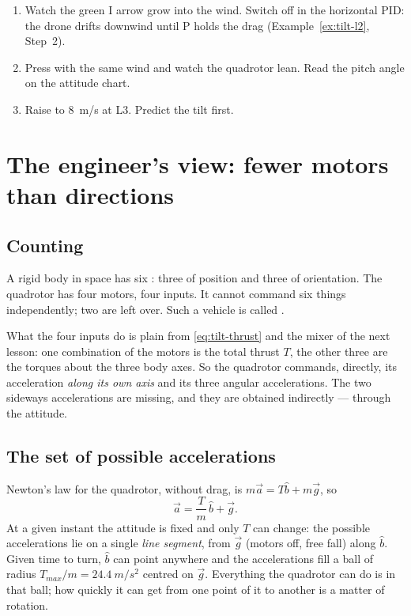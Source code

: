 \begin{trythis}
\begin{enumerate}
  \item Watch the green I arrow grow into the wind. Switch \It off in the horizontal PID: the drone drifts downwind until P holds the drag (Example~\ref{ex:tilt-l2}, Step~2).
  \item Press  with the same wind and watch the quadrotor lean. Read the pitch angle on the attitude chart.
  \item Raise  to \SI{8}{m/s} at L3. Predict the tilt first.
\end{enumerate}
\end{trythis}

\section{The engineer's view: fewer motors than directions}

\subsection{Counting}
A rigid body in space has six : three of position and three of orientation. The quadrotor has four motors, four inputs. It cannot command six things independently; two are left over. Such a vehicle is called .

What the four inputs do is plain from \cref{eq:tilt-thrust} and the mixer of the next lesson: one combination of the motors is the total thrust $T$, the other three are the torques about the three body axes. So the quadrotor commands, directly, its acceleration \emph{along its own axis} and its three angular accelerations. The two sideways accelerations are missing, and they are obtained indirectly — through the attitude.

\subsection{The set of possible accelerations}
Newton's law for the quadrotor, without drag, is $m\vec a = T\hat b + m\vec g$, so
\begin{equation}\label{eq:tilt-acc}
  \vec a = \frac{T}{m}\,\hat b + \vec g .
\end{equation}
At a given instant the attitude is fixed and only $T$ can change: the possible accelerations lie on a single \emph{line segment}, from $\vec g$ (motors off, free fall) along $\hat b$. Given time to turn, $\hat b$ can point anywhere and the accelerations fill a ball of radius $T_{max}/m = \SI{24.4}{m/s^2}$ centred on $\vec g$. Everything the quadrotor can do is in that ball; how quickly it can get from one point of it to another is a matter of rotation.

